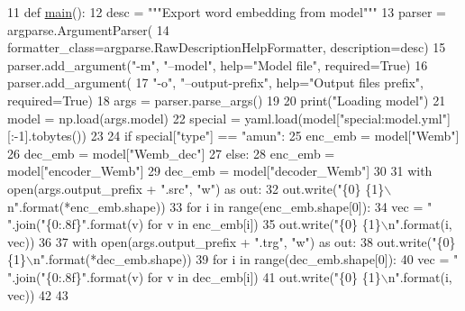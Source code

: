 \begin{DoxyCode}
11 \textcolor{keyword}{def }\hyperlink{namespaceexport__embeddings_a461679a46a183a3fee6ec09b838d4da0}{main}():
12     desc = \textcolor{stringliteral}{"""Export word embedding from model"""}
13     parser = argparse.ArgumentParser(
14         formatter\_class=argparse.RawDescriptionHelpFormatter, description=desc)
15     parser.add\_argument(\textcolor{stringliteral}{"-m"}, \textcolor{stringliteral}{"--model"}, help=\textcolor{stringliteral}{"Model file"}, required=\textcolor{keyword}{True})
16     parser.add\_argument(
17         \textcolor{stringliteral}{"-o"}, \textcolor{stringliteral}{"--output-prefix"}, help=\textcolor{stringliteral}{"Output files prefix"}, required=\textcolor{keyword}{True})
18     args = parser.parse\_args()
19 
20     print(\textcolor{stringliteral}{"Loading model"})
21     model = np.load(args.model)
22     special = yaml.load(model[\textcolor{stringliteral}{"special:model.yml"}][:-1].tobytes())
23 
24     \textcolor{keywordflow}{if} special[\textcolor{stringliteral}{"type"}] == \textcolor{stringliteral}{"amun"}:
25         enc\_emb = model[\textcolor{stringliteral}{"Wemb"}]
26         dec\_emb = model[\textcolor{stringliteral}{"Wemb\_dec"}]
27     \textcolor{keywordflow}{else}:
28         enc\_emb = model[\textcolor{stringliteral}{"encoder\_Wemb"}]
29         dec\_emb = model[\textcolor{stringliteral}{"decoder\_Wemb"}]
30 
31     with open(args.output\_prefix + \textcolor{stringliteral}{".src"}, \textcolor{stringliteral}{"w"}) \textcolor{keyword}{as} out:
32         out.write(\textcolor{stringliteral}{"\{0\} \{1\}\(\backslash\)n"}.format(*enc\_emb.shape))
33         \textcolor{keywordflow}{for} i \textcolor{keywordflow}{in} range(enc\_emb.shape[0]):
34             vec = \textcolor{stringliteral}{" "}.join(\textcolor{stringliteral}{"\{0:.8f\}"}.format(v) \textcolor{keywordflow}{for} v \textcolor{keywordflow}{in} enc\_emb[i])
35             out.write(\textcolor{stringliteral}{"\{0\} \{1\}\(\backslash\)n"}.format(i, vec))
36 
37     with open(args.output\_prefix + \textcolor{stringliteral}{".trg"}, \textcolor{stringliteral}{"w"}) \textcolor{keyword}{as} out:
38         out.write(\textcolor{stringliteral}{"\{0\} \{1\}\(\backslash\)n"}.format(*dec\_emb.shape))
39         \textcolor{keywordflow}{for} i \textcolor{keywordflow}{in} range(dec\_emb.shape[0]):
40             vec = \textcolor{stringliteral}{" "}.join(\textcolor{stringliteral}{"\{0:.8f\}"}.format(v) \textcolor{keywordflow}{for} v \textcolor{keywordflow}{in} dec\_emb[i])
41             out.write(\textcolor{stringliteral}{"\{0\} \{1\}\(\backslash\)n"}.format(i, vec))
42 
43 
\end{DoxyCode}
